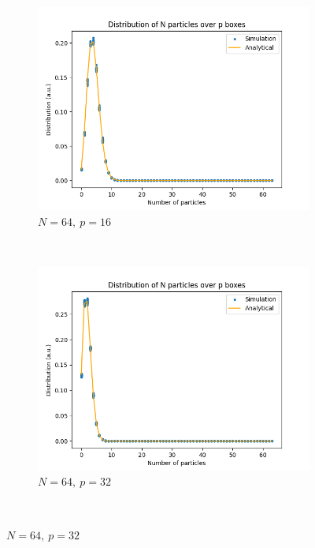 \documentclass{assignmeownt}
\begin{document}
\begin{figure}
     \centering
     \begin{subfigure}[b]{0.5\textwidth}
         \centering
         \includegraphics[width=\linewidth]{../block1/1-DistributionOfParticles/Results/64_16.png}
         \caption{$N=64,\ p=16$}
     \end{subfigure}\\
     \begin{subfigure}[b]{0.5\textwidth}
         \centering
         \includegraphics[width=\linewidth]{../block1/1-DistributionOfParticles/Results/64_32.png}
         \caption{$N=64,\ p=32$}
     \end{subfigure}\\

\end{figure}
\end{document}

